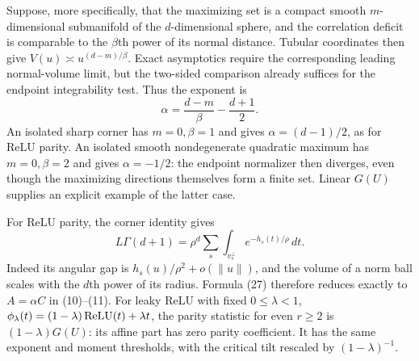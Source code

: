 Suppose, more specifically, that the maximizing set is a compact smooth
$m$-dimensional submanifold of the $d$-dimensional sphere, and the
correlation deficit is comparable to the $\beta$th power of its normal
distance. Tubular coordinates then give
$V(u)\asymp u^{(d-m)/\beta}$. Exact asymptotics require the corresponding
leading normal-volume limit, but the two-sided comparison already
suffices for the endpoint integrability test. Thus the exponent is
\[
                  \alpha=\frac{d-m}{\beta}-\frac{d+1}{2}. \tag{30}
\]
An isolated sharp corner has $m=0,\beta=1$ and gives
$\alpha=(d-1)/2$, as for ReLU parity. An isolated smooth nondegenerate
quadratic maximum has $m=0,\beta=2$ and gives $\alpha=-1/2$:
the endpoint normalizer then diverges, even though the maximizing
directions themselves form a finite set. Linear $G(U)$ supplies an
explicit example of the latter case.

For ReLU parity, the corner identity gives
\[
 L\Gamma(d+1)=\rho^d\sum_s\int_{v_s^\perp}e^{-h_s(t)/\rho}\,dt.
\]
Indeed its angular gap is $h_s(u)/\rho^2+o(\|u\|)$, and the
volume of a norm ball scales with the $d$th power of its radius.
Formula (27) therefore reduces exactly to $A=\alpha C$ in (10)--(11).
For leaky ReLU with fixed $0\le\lambda<1$,
$\phi_\lambda(t)=(1-\lambda)\operatorname{ReLU}(t)+\lambda t$, the parity
statistic for even $r\ge2$ is $(1-\lambda)G(U)$: its affine part
has zero parity coefficient. It has the same exponent and moment
thresholds, with the critical tilt rescaled by $(1-\lambda)^{-1}$.
